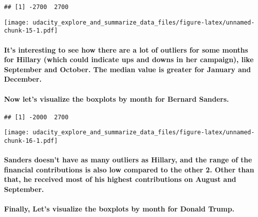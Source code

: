 \documentclass[]{article}
\let\oldparagraph\paragraph
\renewcommand{\paragraph}[1]{\oldparagraph{#1}\mbox{}}
\begin{document}
\begin{verbatim}
## [1] -2700  2700
\end{verbatim}

\texttt{[image: udacity\_explore\_and\_summarize\_data\_files/figure-latex/unnamed-chunk-15-1.pdf]}

\paragraph{It's interesting to see how there are a lot of outliers for
some months for Hillary (which could indicate ups and downs in her
campaign), like September and October. The median value is greater for
January and
December.}\label{its-interesting-to-see-how-there-are-a-lot-of-outliers-for-some-months-for-hillary-which-could-indicate-ups-and-downs-in-her-campaign-like-september-and-october.-the-median-value-is-greater-for-january-and-december.}

\paragraph{Now let's visualize the boxplots by month for Bernard
Sanders.}\label{now-lets-visualize-the-boxplots-by-month-for-bernard-sanders.}

\begin{verbatim}
## [1] -2000  2700
\end{verbatim}

\texttt{[image: udacity\_explore\_and\_summarize\_data\_files/figure-latex/unnamed-chunk-16-1.pdf]}

\paragraph{Sanders doesn't have as many outliers as Hillary, and the
range of the financial contributions is also low compared to the other
2. Other than that, he received most of his highest contributions on
August and
September.}\label{sanders-doesnt-have-as-many-outliers-as-hillary-and-the-range-of-the-financial-contributions-is-also-low-compared-to-the-other-2.-other-than-that-he-received-most-of-his-highest-contributions-on-august-and-september.}

\paragraph{Finally, Let's visualize the boxplots by month for Donald
Trump.}\label{finally-lets-visualize-the-boxplots-by-month-for-donald-trump.}
\end{document}
